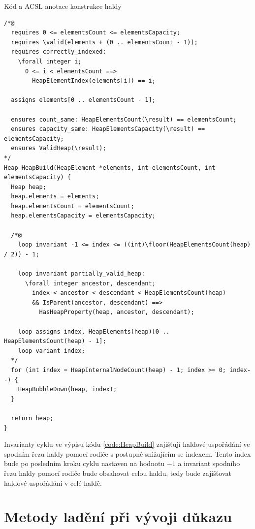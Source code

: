 \begin{listing}[H]
	\caption{Kód a ACSL anotace konstrukce haldy}
	\label{code:HeapBuild}
	\begin{verbatim}
/*@
  requires 0 <= elementsCount <= elementsCapacity;
  requires \valid(elements + (0 .. elementsCount - 1));
  requires correctly_indexed:
    \forall integer i;
      0 <= i < elementsCount ==>
        HeapElementIndex(elements[i]) == i;

  assigns elements[0 .. elementsCount - 1];

  ensures count_same: HeapElementsCount(\result) == elementsCount;
  ensures capacity_same: HeapElementsCapacity(\result) == elementsCapacity;
  ensures ValidHeap(\result);
*/
Heap HeapBuild(HeapElement *elements, int elementsCount, int elementsCapacity) {
  Heap heap;
  heap.elements = elements;
  heap.elementsCount = elementsCount;
  heap.elementsCapacity = elementsCapacity;

  /*@
    loop invariant -1 <= index <= ((int)\floor(HeapElementsCount(heap) / 2)) - 1;

    loop invariant partially_valid_heap:
      \forall integer ancestor, descendant;
        index < ancestor < descendant < HeapElementsCount(heap)
        && IsParent(ancestor, descendant) ==>
          HasHeapProperty(heap, ancestor, descendant);

    loop assigns index, HeapElements(heap)[0 .. HeapElementsCount(heap) - 1];
    loop variant index;
  */
  for (int index = HeapInternalNodeCount(heap) - 1; index >= 0; index--) {
    HeapBubbleDown(heap, index);
  }

  return heap;
}
	\end{verbatim}
\end{listing}

\pagebreak

Invarianty cyklu ve výpisu kódu \ref{code:HeapBuild} zajišťují haldové uspořádání ve spodním řezu haldy pomocí rodiče s postupně snižujícím se indexem. Tento index bude po posledním kroku cyklu nastaven na hodnotu $-1$ a invariant spodního řezu haldy pomocí rodiče bude obsahovat celou haldu, tedy bude zajišťovat haldové uspořádání v celé haldě.

\chapter{Metody ladění při vývoji důkazu}

